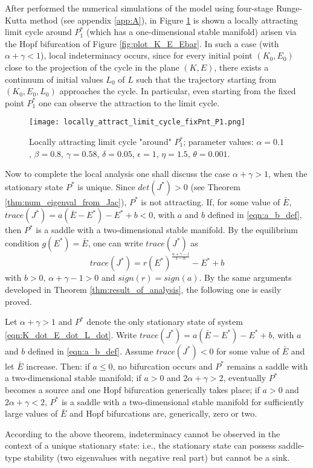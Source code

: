 After performed the numerical simulations of the model using four-stage Runge-Kutta method (see appendix \ref{app:A}), in Figure \ref{fig:local_attract_lim_cycle_P1} is shown a locally attracting limit cycle around $P_1^*$ (which has a one-dimensional stable manifold) arisen via the Hopf bifurcation of Figure \ref{fig:plot_K_E_Ebar}. In such a case (with $\alpha+\gamma<1$), local indeterminacy occurs, since for every initial point $(K_0,E_0)$ close to the projection of the cycle in the plane $(K,E)$, there exists a continuum of initial values $L_0$ of $L$ such that the trajectory starting from $(K_0,E_0,L_0)$ approaches the cycle. In particular, even starting from the fixed point  $P_1^*$ one can observe the attraction to the limit cycle.
\begin{figure}[h!]
	\centering
	\texttt{[image: locally\_attract\_limit\_cycle\_fixPnt\_P1.png]}
	\caption{Locally attracting limit cycle "around" $P_1^*$; parameter values: $\alpha=0.1$, $\beta=0.8$, $\gamma=0.58$, $\delta=0.05$, $\epsilon=1$, $\eta=1.5$, $\theta=0.001$.}
	\label{fig:local_attract_lim_cycle_P1}
\end{figure}

Now to complete the local analysis one shall discuss the case $\alpha+\gamma>1$, when the stationary state $P^*$ is unique. Since $det(J^*) > 0$ (see Theorem \ref{thm:num_eigenval_from_Jac}), $P^*$ is not attracting. If, for some value of $\bar{E}$, $trace(J^*)=a(\bar{E}-E^*)-E^*+b<0$, with $a$ and $b$ defined in \eqref{eqn:a_b_def}, then $P^*$ is a saddle with a two-dimensional stable manifold. By the equilibrium condition $g(E^*)=\bar{E}$, one can write $trace(J^*)$ as
$$trace(J^*)=r(E^*)^{\frac{\alpha+\gamma-1}{1-\alpha}}-E^*+b$$
with $b>0$, $\alpha+\gamma-1>0$ and $sign(r)=sign(a)$. 
By the same arguments developed in Theorem \ref{thm:result_of_analysis}, the following one is easily proved.
\begin{thm} \label{thm:}
	Let $\alpha+\gamma>1$ and $P^*$ denote the only stationary state of system \eqref{eqn:K_dot_E_dot_L_dot}. Write $trace(J^*)=a(\bar{E}-E^*)-E^*+b$, with $a$ and $b$ defined in \eqref{eqn:a_b_def}. Assume $trace(J^*) < 0$ for some value of $\bar{E}$ and let $\bar{E}$ increase. Then: if $a\leq0$, no bifurcation occurs and $P^*$ remains a saddle with a two-dimensional stable manifold; if $a>0$ and $2\alpha+\gamma>2$, eventually $P^*$ becomes a source and one Hopf bifurcation generically takes place; if $a>0$ and $2\alpha+\gamma<2$, $P^*$ is a saddle with a two-dimensional stable manifold for sufficiently large values of $\bar{E}$ and Hopf bifurcations are, generically, zero or two.
\end{thm}
According to the above theorem, indeterminacy cannot be observed in the context of a unique stationary state: i.e., the stationary state can possess saddle-type stability (two eigenvalues with negative real part) but cannot be a sink.